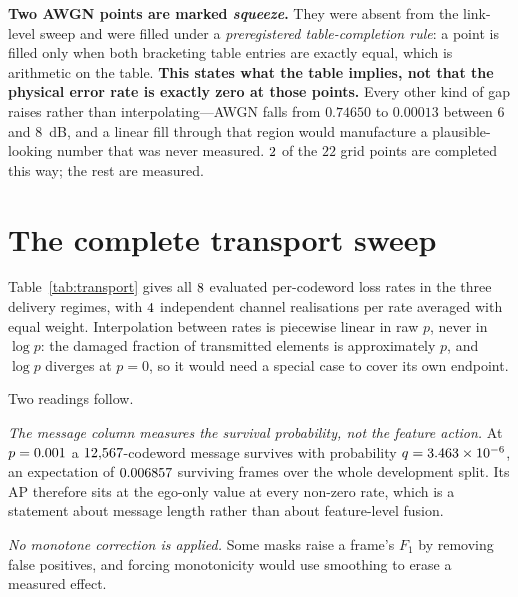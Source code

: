 \documentclass[journal]{IEEEtran}
\begin{document}
\textbf{Two AWGN points are marked \emph{squeeze}.} They were absent from the link-level sweep and
were filled under a \emph{preregistered table-completion rule}: a point is filled only when both
bracketing table entries are exactly equal, which is arithmetic on the table. \textbf{This states
what the table implies, not that the physical error rate is exactly zero at those points.} Every
other kind of gap raises rather than interpolating---AWGN falls from $0.74650$ to $0.00013$ between
$6$ and $8$~dB, and a linear fill through that region would manufacture a plausible-looking number
that was never measured. $2$ of the $22$ grid points are completed this way; the rest
are measured.

\begin{table}[t]
\caption{The operating grid: per-codeword erasure probability at each SNR point and channel type.
\emph{squeeze} marks a point filled under the preregistered completion rule because both bracketing
entries were exactly equal; it is a statement about the table, not about the channel.}
\label{tab:chgrid}
\centering\small\setlength{\tabcolsep}{5pt}

\end{table}

\section{The complete transport sweep}
Table~\ref{tab:transport} gives all $8$ evaluated per-codeword loss rates in the three
delivery regimes, with $4$ independent channel realisations per rate averaged
with equal weight. Interpolation between rates is piecewise linear in raw $p$, never in $\log p$:
the damaged fraction of transmitted elements is approximately $p$, and $\log p$ diverges at $p = 0$,
so it would need a special case to cover its own endpoint.

Two readings follow.

\emph{The message column measures the survival probability, not the feature action.} At
$p = 0.001$ a $12{,}567$-codeword message survives with probability
$q = 3.463\times10^{-6}$, an expectation of $0.006857$ surviving frames over the whole
development split. Its AP therefore sits at the ego-only value at every non-zero rate, which is a
statement about message length rather than about feature-level fusion.

\emph{No monotone correction is applied.} Some masks raise a frame's $F_1$ by removing false
positives, and forcing monotonicity would use smoothing to erase a measured effect.
\end{document}
